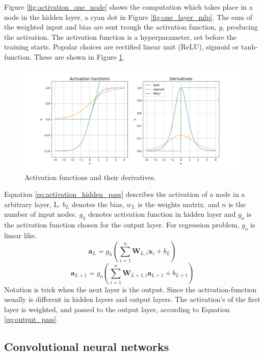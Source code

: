 \documentclass{article}
\begin{document}
Figure \ref{fig:activation_one_node} shows the computation which takes place in a node in the hidden layer, a cyan dot in Figure \ref{fig:one_layer_mlp}. The sum of the weighted input and bias are sent trough the activation function, $g$, producing the activation. The activation function is a hyperparameter, set before the training starts. Popular choices are rectified linear unit (ReLU), sigmoid or tanh-function. These are shown in Figure \ref{fig:activation_function_example}.
\begin{figure}
    \centering
    \includegraphics[scale = 0.4]{activation_functions_and_derivatives.png}
    \caption{Activation functions and their derivatives.}
    \label{fig:activation_function_example}
\end{figure}
Equation \eqref{eq:activation_hidden_pass} describes the activation of a node in a arbitrary layer, L. $b_L$ denotes the bias, $w_L$ is the weights matrix. and $n$ is the number of input nodes. $g_h$ denotes activation function in hidden layer and $g_o$ is the activation function chosen for the output layer. For regression problem, $g_o$ is linear like.
\begin{equation} \label{eq:activation_hidden_pass}
    \textbf{a}_L = g_h(\sum_{i=1}^n \textbf{W}_{L, i} \textbf{x}_i + b_L)
\end{equation}
\begin{equation} \label{eq:output_pass}
    \textbf{a}_{L+1} = g_o(\sum_{i=1}^n \textbf{W}_{L+1, i} \textbf{a}_{L+1} + b_{L+1})
\end{equation}
Notation is trick when the next layer is the output. Since the activation-function usually is different in hidden layers and output layers. 
The activation's of the first layer is weighted, and passed to the output layer, according to Equation \eqref{eq:output_pass}.

\subsection{Convolutional neural networks} \label{sec:convolutional neural network}
\end{document}
